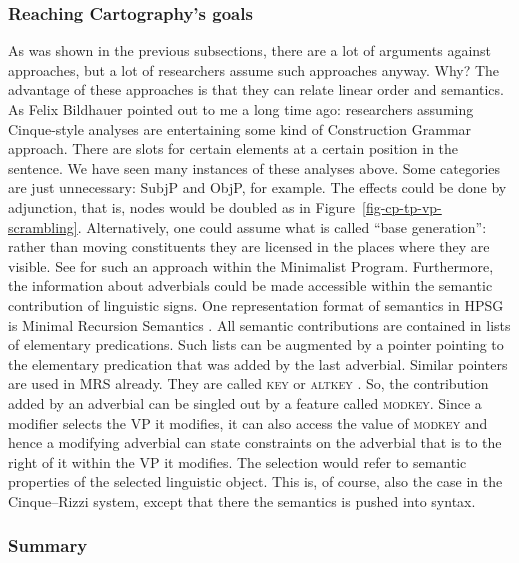 \subsubsection{Reaching Cartography's goals}
\label{sec-Cinque-solution}

As was shown in the previous subsections, there are a lot of arguments against
\citeauthor{CR2010a} approaches, but a lot of researchers assume such approaches anyway. Why? The
advantage of these approaches is that they can relate linear order and semantics. As Felix Bildhauer
pointed out to me a long time ago: researchers assuming Cinque-style analyses are entertaining some kind of Construction Grammar
approach. There are slots for certain elements at a certain position in the sentence. We have seen
many instances of these analyses above. Some categories are just unnecessary: SubjP and ObjP, for
example. The effects could be done by adjunction, that is, nodes would be doubled as in
Figure~\ref{fig-cp-tp-vp-scrambling}. Alternatively, one could assume what is called ``base
generation'': rather than moving constituents they are licensed in the places where they are visible. See
\citet{Fanselow2001a} for such an approach within the Minimalist Program.
Furthermore, the information about adverbials could be made accessible
within the semantic contribution of linguistic signs. One representation format of semantics in HPSG
is Minimal Recursion Semantics \citep{CFPS2005a}. All semantic contributions are contained in lists of elementary
predications. Such lists can be augmented by a pointer pointing to the elementary predication that
was added by the last adverbial. Similar pointers are used in MRS already. They are called
\textsc{key} or \textsc{altkey} \parencites[Section~3.7]{FBO2003a-u}[]{CFPS2005a}. So, the contribution added by an adverbial can be singled out by a
feature called \textsc{modkey}. Since a modifier selects the VP it modifies, it can also access the value of \textsc{modkey} and hence a
modifying adverbial can state constraints on the adverbial that is to the right of it within the VP
it modifies. The selection would refer to semantic properties of the selected linguistic
object. This is, of course, also the case in the Cinque–Rizzi system, except that there the
semantics is pushed into syntax.%

\subsubsection{Summary}

